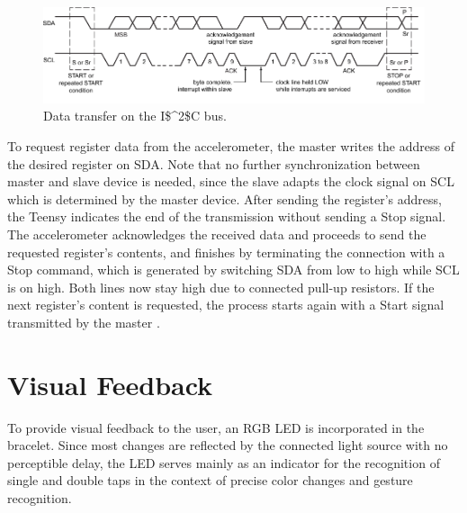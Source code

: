 \begin{figure}[bth]
	\myfloatalign
	\includegraphics[width=\linewidth]{gfx/i2c.pdf}
	\caption{Data transfer on the \ac{I$^2$C} bus. \cite{i2c}} \label{fig:i2c}
\end{figure}

To request register data from the accelerometer, the master writes the address of the desired register on \textsc{SDA}. Note that no further synchronization between master and slave device is needed, since the slave adapts the clock signal on \textsc{SCL} which is determined by the master device. After sending the register's address, the Teensy indicates the end of the transmission without sending a Stop signal. The accelerometer acknowledges the received data and proceeds to send the requested register's contents, and finishes by terminating the connection with a Stop command, which is generated by switching \textsc{SDA} from low to high while \textsc{SCL} is on high. Both lines now stay high due to connected pull-up resistors. If the next register's content is requested, the process starts again with a Start signal transmitted by the master \cite{i2c}.

\section{Visual Feedback}
To provide visual feedback to the user, an \textsc{RGB} \ac{LED} is incorporated in the bracelet. Since most changes are reflected by the connected light source with no perceptible delay, the \ac{LED} serves mainly as an indicator for the recognition of single and double taps in the context of precise color changes and gesture recognition.